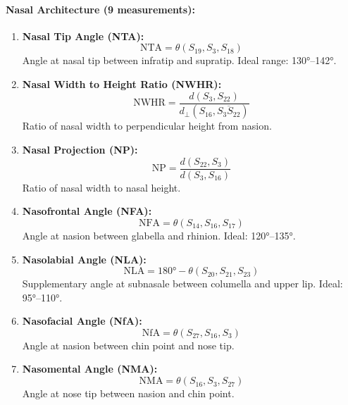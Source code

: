 \paragraph{Nasal Architecture (9 measurements):}
\begin{enumerate}
    \item \textbf{Nasal Tip Angle (NTA):}
    \begin{equation}
    \text{NTA} = \theta(S_{19}, S_3, S_{18})
    \end{equation}
    Angle at nasal tip between infratip and supratip. Ideal range: 130°--142°.
    
    \item \textbf{Nasal Width to Height Ratio (NWHR):}
    \begin{equation}
    \text{NWHR} = \frac{d(S_3, S_{22})}{d_\perp(S_{16}, \overline{S_3S_{22}})}
    \end{equation}
    Ratio of nasal width to perpendicular height from nasion.
    
    \item \textbf{Nasal Projection (NP):}
    \begin{equation}
    \text{NP} = \frac{d(S_{22}, S_3)}{d(S_3, S_{16})}
    \end{equation}
    Ratio of nasal width to nasal height.
    
    \item \textbf{Nasofrontal Angle (NFA):}
    \begin{equation}
    \text{NFA} = \theta(S_{14}, S_{16}, S_{17})
    \end{equation}
    Angle at nasion between glabella and rhinion. Ideal: 120°--135°.
    
    \item \textbf{Nasolabial Angle (NLA):}
    \begin{equation}
    \text{NLA} = 180° - \theta(S_{20}, S_{21}, S_{23})
    \end{equation}
    Supplementary angle at subnasale between columella and upper lip. Ideal: 95°--110°.
    
    \item \textbf{Nasofacial Angle (NfA):}
    \begin{equation}
    \text{NfA} = \theta(S_{27}, S_{16}, S_3)
    \end{equation}
    Angle at nasion between chin point and nose tip.
    
    \item \textbf{Nasomental Angle (NMA):}
    \begin{equation}
    \text{NMA} = \theta(S_{16}, S_3, S_{27})
    \end{equation}
    Angle at nose tip between nasion and chin point.
    

\end{enumerate}
